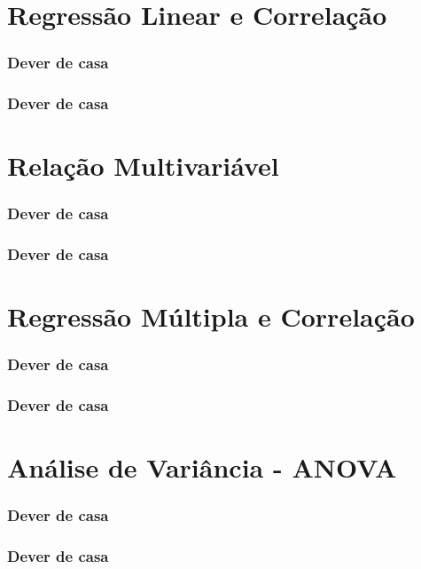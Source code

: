 \documentclass[graphics,14pt]{beamer}
\begin{document}
\section{Regressão Linear e Correlação}
\begin{frame}[t,fragile=singleslide]
\frametitle{Dever de casa}
\end{frame}
\begin{frame}[t,fragile=singleslide]
\frametitle{Dever de casa}
\end{frame}
\section{Relação Multivariável}
\begin{frame}[t,fragile=singleslide]
\frametitle{Dever de casa}
\end{frame}
\begin{frame}[t,fragile=singleslide]
\frametitle{Dever de casa}
\end{frame}
\section{Regressão Múltipla e Correlação}
\begin{frame}[t,fragile=singleslide]
\frametitle{Dever de casa}
\end{frame}
\begin{frame}[t,fragile=singleslide]
\frametitle{Dever de casa}
\end{frame}
\section{Análise de Variância - ANOVA}
\begin{frame}[t,fragile=singleslide]
\frametitle{Dever de casa}
\end{frame}
\begin{frame}[t,fragile=singleslide]
\frametitle{Dever de casa}
\end{frame}
\end{document}

